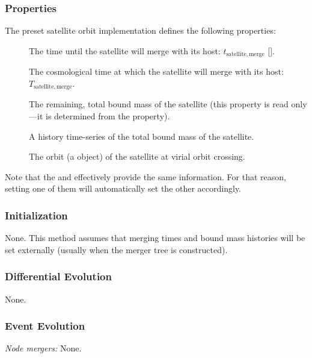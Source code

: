 \subsubsection{Properties}

The preset satellite orbit implementation defines the following properties:
\begin{description}
 \item [] The time until the satellite will merge with its host: $t_\mathrm{satellite, merge}$ [].
 \item [] The cosmological time at which the satellite will merge with its host: $T_\mathrm{satellite, merge}$.
 \item [] The remaining, total bound mass of the satellite (this property is read only---it is determined from the  property).
 \item [] A history time-series of the total bound mass of the satellite.
 \item [] The orbit (a \href{https://github.com/galacticusorg/galacticus/releases/download/bleeding-edge/Galacticus_Development.pdf\#sec.KeplerOrbits} object) of the satellite at virial orbit crossing.
\end{description}

Note that the  and  effectively provide the same information. For that reason, setting one of them will automatically set the other accordingly.

\subsubsection{Initialization}

None. This method assumes that merging times and bound mass histories will be set externally (usually when the merger tree is constructed).

\subsubsection{Differential Evolution}

None.

\subsubsection{Event Evolution}

\noindent\emph{Node mergers:} None.\\

